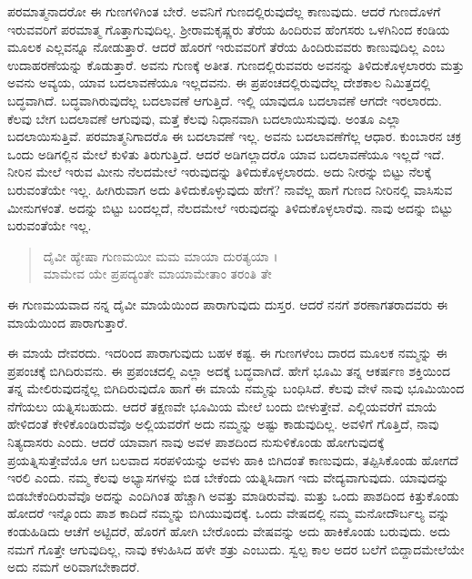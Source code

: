 ಪರಮಾತ್ಮನಾದರೋ ಈ ಗುಣಗಳಿಗಿಂತ ಬೇರೆ. ಅವನಿಗೆ ಗುಣದಲ್ಲಿರುವುದೆಲ್ಲ ಕಾಣುವುದು. ಆದರೆ ಗುಣದೊಳಗೆ ಇರುವವರಿಗೆ ಪರಮಾತ್ಮ ಗೊತ್ತಾಗುವುದಿಲ್ಲ. ಶ್ರೀರಾಮಕೃಷ್ಣರು ತೆರೆಯ ಹಿಂದಿರುವ ಹೆಂಗಸರು ಒಳಗಿನಿಂದ ಕಂಡಿಯ ಮೂಲಕ ಎಲ್ಲವನ್ನೂ ನೋಡುತ್ತಾರೆ. ಆದರೆ ಹೊರಗೆ ಇರುವವರಿಗೆ ತೆರೆಯ ಹಿಂದಿರುವವರು ಕಾಣುವುದಿಲ್ಲ ಎಂಬ ಉದಾಹರಣೆಯನ್ನು ಕೊಡುತ್ತಾರೆ. ಅವನು ಗುಣಕ್ಕೆ ಅತೀತ. ಗುಣದಲ್ಲಿರುವವರು ಅವನನ್ನು ತಿಳಿದುಕೊಳ್ಳಲಾರರು ಮತ್ತು ಅವನು ಅವ್ಯಯ, ಯಾವ ಬದಲಾವಣೆಯೂ ಇಲ್ಲದವನು. ಈ ಪ್ರಪಂಚದಲ್ಲಿರುವುದೆಲ್ಲ ದೇಶಕಾಲ ನಿಮಿತ್ತದಲ್ಲಿ ಬದ್ಧವಾಗಿದೆ. ಬದ್ಧವಾಗಿರುವುದೆಲ್ಲ ಬದಲಾವಣೆ ಆಗುತ್ತಿದೆ. ಇಲ್ಲಿ ಯಾವುದೂ ಬದಲಾವಣೆ ಆಗದೇ ಇರಲಾರದು. ಕೆಲವು ಬೇಗ ಬದಲಾವಣೆ ಆಗುವುವು, ಮತ್ತೆ ಕೆಲವು ನಿಧಾನವಾಗಿ ಬದಲಾಯಿಸುವುವು. ಅಂತೂ ಎಲ್ಲಾ ಬದಲಾಯಿಸುತ್ತಿವೆ. ಪರಮಾತ್ಮನಿಗಾದರೊ ಈ ಬದಲಾವಣೆ ಇಲ್ಲ. ಅವನು ಬದಲಾವಣೆಗೆಲ್ಲ ಆಧಾರ. ಕುಂಬಾರನ ಚಕ್ರ ಒಂದು ಅಡಿಗಲ್ಲಿನ ಮೇಲೆ ಕುಳಿತು ತಿರುಗುತ್ತಿದೆ. ಆದರೆ ಅಡಿಗಲ್ಲಾದರೊ ಯಾವ ಬದಲಾವಣೆಯೂ ಇಲ್ಲದೆ ಇದೆ. ನೀರಿನ ಮೇಲೆ ಇರುವ ಮೀನು ನೆಲದಮೇಲೆ ಇರುವುದನ್ನು ತಿಳಿದುಕೊಳ್ಳಲಾರದು. ಅದು ನೀರನ್ನು ಬಿಟ್ಟು ನೆಲಕ್ಕೆ ಬರುವಂತೆಯೇ ಇಲ್ಲ. ಹೀಗಿರುವಾಗ ಅದು ತಿಳಿದುಕೊಳ್ಳುವುದು ಹೇಗೆ? ನಾವೆಲ್ಲ ಹಾಗೆ ಗುಣದ ನೀರಿನಲ್ಲಿ ವಾಸಿಸುವ ಮೀನುಗಳಂತೆ. ಅದನ್ನು ಬಿಟ್ಟು ಬಂದಲ್ಲದೆ, ನೆಲದಮೇಲೆ ಇರುವುದನ್ನು ತಿಳಿದುಕೊಳ್ಳಲಾರೆವು. ನಾವು ಅದನ್ನು ಬಿಟ್ಟು ಬರುವಂತೆಯೇ ಇಲ್ಲ.

\begin{verse}
ದೈವೀ ಹ್ಯೇಷಾ ಗುಣಮಯೀ ಮಮ ಮಾಯಾ ದುರತ್ಯಯಾ ।\\ಮಾಮೇವ ಯೇ ಪ್ರಪದ್ಯಂತೇ ಮಾಯಾಮೇತಾಂ ತರಂತಿ ತೇ 
\end{verse}

{\small ಈ ಗುಣಮಯವಾದ ನನ್ನ ದೈವೀ ಮಾಯೆಯಿಂದ ಪಾರಾಗುವುದು ದುಸ್ತರ. ಆದರೆ ನನಗೆ ಶರಣಾಗತರಾದವರು ಈ ಮಾಯೆಯಿಂದ ಪಾರಾಗುತ್ತಾರೆ.}

ಈ ಮಾಯೆ ದೇವರದು. ಇದರಿಂದ ಪಾರಾಗುವುದು ಬಹಳ ಕಷ್ಟ. ಈ ಗುಣಗಳೆಂಬ ದಾರದ ಮೂಲಕ ನಮ್ಮನ್ನು ಈ ಪ್ರಪಂಚಕ್ಕೆ ಬಿಗಿದಿರುವನು. ಈ ಪ್ರಪಂಚದಲ್ಲಿ ಎಲ್ಲಾ ಅದಕ್ಕೆ ಬದ್ಧವಾಗಿದೆ. ಹೇಗೆ ಭೂಮಿ ತನ್ನ ಆಕರ್ಷಣ ಶಕ್ತಿಯಿಂದ ತನ್ನ ಮೇಲಿರುವುದನ್ನೆಲ್ಲ ಬಿಗಿದಿರುವುದೊ ಹಾಗೆ ಈ ಮಾಯೆ ನಮ್ಮನ್ನು ಬಂಧಿಸಿದೆ. ಕೆಲವು ವೇಳೆ ನಾವು ಭೂಮಿಯಿಂದ ನೆಗೆಯಲು ಯತ್ನಿಸಬಹುದು. ಆದರೆ ತಕ್ಷಣವೇ ಭೂಮಿಯ ಮೇಲೆ ಬಂದು ಬೀಳುತ್ತೇವೆ. ಎಲ್ಲಿಯವರೆಗೆ ಮಾಯೆ ಹೇಳಿದಂತೆ ಕೇಳಿಕೊಂಡಿರುವೆವೊ ಅಲ್ಲಿಯವರೆಗೆ ಅದು ನಮ್ಮನ್ನು ಅಷ್ಟು ಕಾಡುವುದಿಲ್ಲ. ಅವಳಿಗೆ ಗೊತ್ತಿದೆ, ನಾವು ನಿತ್ಯದಾಸರು ಎಂದು. ಆದರೆ ಯಾವಾಗ ನಾವು ಅವಳ ಪಾಶದಿಂದ ನುಸುಳಿಕೊಂಡು ಹೋಗುವುದಕ್ಕೆ ಪ್ರಯತ್ನಿಸುತ್ತೇವೆಯೊ ಆಗ ಬಲವಾದ ಸರಪಳಿಯನ್ನು ಅವಳು ಹಾಕಿ ಬಿಗಿದಂತೆ ಕಾಣುವುದು, ತಪ್ಪಿಸಿಕೊಂಡು ಹೋಗದೆ ಇರಲಿ ಎಂದು. ನಮ್ಮ ಕೆಲವು ಅಭ್ಯಾಸಗಳನ್ನು ಬಿಡ ಬೇಕೆಂದು ಯತ್ನಿಸಿದಾಗ ಇದು ವೇದ್ಯವಾಗುವುದು. ಯಾವುದನ್ನು ಬಿಡಬೇಕೆಂದಿರುವೆವೊ ಅದನ್ನು ಎಂದಿಗಿಂತ ಹೆಚ್ಚಾಗಿ ಅವತ್ತು ಮಾಡಿರುವೆವು. ಮತ್ತು ಒಂದು ಪಾಶದಿಂದ ಕಿತ್ತುಕೊಂಡು ಹೋದರೆ ಇನ್ನೊಂದು ಪಾಶ ಕಾದಿದೆ ನಮ್ಮನ್ನು ಬಿಗಿಯುವುದಕ್ಕೆ. ಒಂದು ವೇಷದಲ್ಲಿ ನಮ್ಮ ಮನೋದೌರ್ಬಲ್ಯ ವನ್ನು ಕಂಡುಹಿಡಿದು ಆಚೆಗೆ ಅಟ್ಟಿದರೆ, ಹೊರಗೆ ಹೋಗಿ ಬೇರೊಂದು ವೇಷವನ್ನು ಅದು ಹಾಕಿಕೊಂಡು ಬರುವುದು. ಅದು ನಮಗೆ ಗೊತ್ತೇ ಆಗುವುದಿಲ್ಲ, ನಾವು ಕಳುಹಿಸಿದ ಹಳೇ ಶತ್ರು ಎಂಬುದು. ಸ್ವಲ್ಪ ಕಾಲ ಅದರ ಬಲೆಗೆ ಬಿದ್ದಾದಮೇಲೆಯೇ ಅದು ನಮಗೆ ಅರಿವಾಗಬೇಕಾದರೆ.

